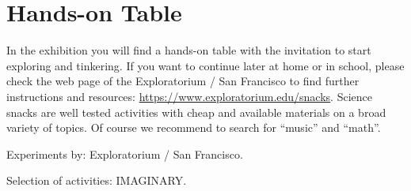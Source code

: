 \section{Hands-on Table}
In the exhibition you will find a hands-on table with the invitation to start exploring and tinkering. If you want to continue later at home or in school, please check the web page of the Exploratorium / San Francisco to find further instructions and resources: \url{https://www.exploratorium.edu/snacks}. Science snacks are well tested activities with cheap and available materials on a broad variety of topics. Of course we recommend to search for ``music'' and ``math''.

\begin{sectcredits}
\item[Experiments by:] Exploratorium / San Francisco.
\item[Selection of activities:] IMAGINARY.
\end{sectcredits}
